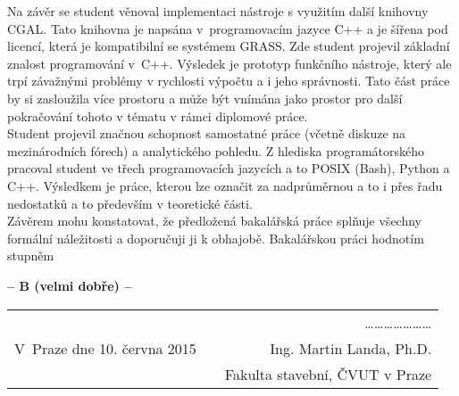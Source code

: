 \documentclass[czech,11pt,a4paper]{article}
\begin{document}
Na závěr se student věnoval implementaci nástroje s využitím další
knihovny CGAL. Tato knihovna je napsána v~programovacím jazyce C++ a
je šířena pod licencí, která je kompatibilní se systémem GRASS. Zde
student projevil základní znalost programování v~C++. Výsledek je
prototyp funkčního nástroje, který ale trpí závažnými problémy v
rychlosti výpočtu a i jeho správnosti. Tato část práce by si zasloužila
více prostoru a může být vnímána jako prostor pro další pokračování
tohoto v tématu v rámci diplomové práce.
\\

Student projevil značnou schopnost samostatné práce (včetně diskuze na
mezinárodních fórech) a analytického pohledu. Z hlediska
programátorského pracoval student ve třech programovacích jazycích a
to POSIX (Bash), Python a C++. Výsledkem je práce, kterou lze označit
za nadprůměrnou a to i přes řadu nedostatků a to především v
teoretické části.
\\
\newpage
Závěrem mohu konstatovat, že předložená bakalářská práce splňuje
všechny formální náležitosti a doporučuji ji k obhajobě. Bakalářskou
práci hodnotím stupněm

\vskip 2cm

\begin{center}
{\bf -- B (velmi dobře)  --}
\end{center}

\vskip 2cm

\begin{tabular}{lp{}r}
& & \ldots\ldots\ldots\ldots\ldots\ldots\ldots \\
V~Praze dne 10. června 2015 & & Ing. Martin Landa, Ph.D. \\
& & Fakulta stavební, ČVUT v Praze \\
\end{tabular}
\end{document}
